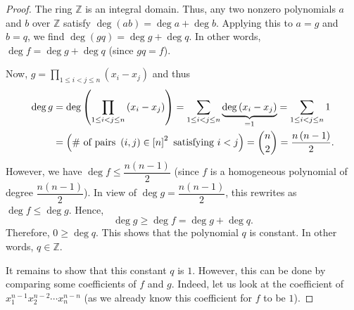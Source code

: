 \begin{proof}
The ring $\mathbb{Z}$ is an integral domain. Thus, any two nonzero polynomials
$a$ and $b$ over $\mathbb{Z}$ satisfy $\deg\left(  ab\right)  =\deg a+\deg b$.
Applying this to $a=g$ and $b=q$, we find $\deg\left(  gq\right)  =\deg g+\deg
q$. In other words, $\deg f=\deg g+\deg q$ (since $gq=f$).

Now, $g=\prod_{1\leq i<j\leq n}\left(  x_{i}-x_{j}\right)  $ and thus%
\begin{align*}
\deg g  &  =\deg\left(  \prod_{1\leq i<j\leq n}\left(  x_{i}-x_{j}\right)
\right)  =\sum_{1\leq i<j\leq n}\underbrace{\deg\left(  x_{i}-x_{j}\right)
}_{=1}=\sum_{1\leq i<j\leq n}1\\
&  =\left(  \text{\# of pairs }\left(  i,j\right)  \in\left[  n\right]
^{2}\text{ satisfying }i<j\right)  =\dbinom{n}{2}=\dfrac{n\left(  n-1\right)
}{2}.
\end{align*}
However, we have $\deg f\leq\dfrac{n\left(  n-1\right)  }{2}$ (since $f$ is a
homogeneous polynomial of degree $\dfrac{n\left(  n-1\right)  }{2}$). In view
of $\deg g=\dfrac{n\left(  n-1\right)  }{2}$, this rewrites as $\deg f\leq\deg
g$. Hence,%
\[
\deg g\geq\deg f=\deg g+\deg q.
\]
Therefore, $0\geq\deg q$. This shows that the polynomial $q$ is constant. In
other words, $q\in\mathbb{Z}$.

It remains to show that this constant $q$ is $1$. However, this can be done by
comparing some coefficients of $f$ and $g$. Indeed, let us look at the
coefficient of $x_{1}^{n-1}x_{2}^{n-2}\cdots x_{n}^{n-n}$ (as we already know
this coefficient for $f$ to be $1$).


\end{proof}
